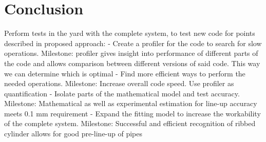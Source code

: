 \section{Conclusion}
\label{sec:conclusion}
Perform tests in the yard with the complete system, to test new code for points described in proposed approach:
- Create a profiler for the code to search for slow operations. Milestone: profiler gives insight into performance of different parts of the code and allows comparison between different versions of said code. This way we can determine which is optimal
- Find more efficient ways to perform the needed operations. Milestone: Increase overall code speed. Use profiler as quantification
- Isolate parts of the mathematical model and test accuracy. Milestone: Mathematical as well as experimental estimation for line-up accuracy meets 0.1 mm requirement
- Expand the fitting model to increase the workability of the complete system. Milestone: Successful and efficient recognition of ribbed cylinder allows for good pre-line-up of pipes